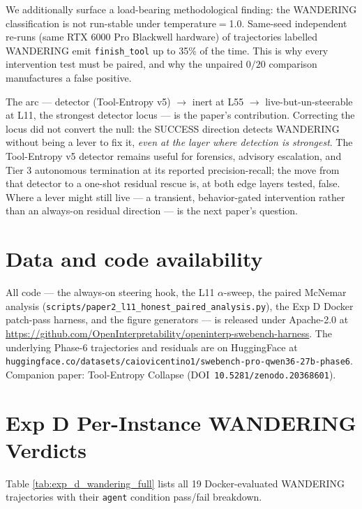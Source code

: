 \documentclass[11pt]{article}
\begin{document}
We additionally surface a load-bearing methodological finding: the WANDERING classification is not run-stable under temperature$=$1.0. Same-seed independent re-runs (same RTX 6000 Pro Blackwell hardware) of trajectories labelled WANDERING emit \texttt{finish\_tool} up to 35\% of the time. This is why every intervention test must be paired, and why the unpaired $0/20$ comparison manufactures a false positive.

The arc --- detector (Tool-Entropy v5) $\to$ inert at L55 $\to$ live-but-un-steerable at L11, the strongest detector locus --- is the paper's contribution. Correcting the locus did not convert the null: the SUCCESS direction detects WANDERING without being a lever to fix it, \emph{even at the layer where detection is strongest}. The Tool-Entropy v5 detector remains useful for forensics, advisory escalation, and Tier 3 autonomous termination at its reported precision-recall; the move from that detector to a one-shot residual rescue is, at both edge layers tested, false. Where a lever might still live --- a transient, behavior-gated intervention rather than an always-on residual direction --- is the next paper's question.

\section*{Data and code availability}
All code --- the always-on steering hook, the L11 $\alpha$-sweep, the paired McNemar analysis (\texttt{scripts/paper2\_l11\_honest\_paired\_analysis.py}), the Exp D Docker patch-pass harness, and the figure generators --- is released under Apache-2.0 at \url{https://github.com/OpenInterpretability/openinterp-swebench-harness}. The underlying Phase-6 trajectories and residuals are on HuggingFace at \texttt{huggingface.co/datasets/caiovicentino1/swebench-pro-qwen36-27b-phase6}. Companion paper: Tool-Entropy Collapse (DOI~\texttt{10.5281/zenodo.20368601}).




\appendix

\section{Exp D Per-Instance WANDERING Verdicts}\label{app:exp_d_per_instance}

Table \ref{tab:exp_d_wandering_full} lists all 19 Docker-evaluated WANDERING trajectories with their \texttt{agent} condition pass/fail breakdown.
\end{document}
